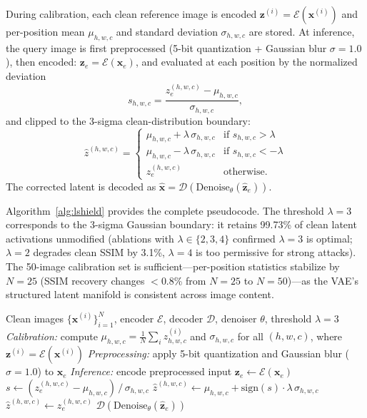 \documentclass[conference]{IEEEtran}
\begin{document}
\label{sec:algorithm}
During calibration, each clean reference image is encoded
$\mathbf{z}^{(i)}\!=\!\mathcal{E}(\mathbf{x}^{(i)})$ and per-position mean
$\mu_{h,w,c}$ and standard deviation $\sigma_{h,w,c}$ are stored. At inference,
the query image is first preprocessed (5-bit quantization + Gaussian blur
$\sigma\!=\!1.0$), then encoded: $\mathbf{z}_e\!=\!\mathcal{E}(\mathbf{x}_e)$,
and evaluated at
each position by the normalized deviation
\begin{equation}
  s_{h,w,c} = \frac{z_e^{(h,w,c)} - \mu_{h,w,c}}{\sigma_{h,w,c}},
\end{equation}
and clipped to the 3-sigma clean-distribution boundary:
\begin{equation}
  \hat{z}^{(h,w,c)} =
  \begin{cases}
    \mu_{h,w,c} + \lambda\,\sigma_{h,w,c} & \text{if } s_{h,w,c} > \lambda \\
    \mu_{h,w,c} - \lambda\,\sigma_{h,w,c} & \text{if } s_{h,w,c} < -\lambda \\
    z_e^{(h,w,c)} & \text{otherwise.}
  \end{cases}
\end{equation}
The corrected latent is decoded as
$\hat{\mathbf{x}}\!=\!\mathcal{D}(\mathrm{Denoise}_\theta(\hat{\mathbf{z}}_e))$.

Algorithm~\ref{alg:lshield} provides the complete pseudocode.
The threshold $\lambda\!=\!3$ corresponds to the 3-sigma Gaussian boundary:
it retains 99.73\% of clean latent activations unmodified (ablations with
$\lambda\!\in\!\{2,3,4\}$ confirmed $\lambda\!=\!3$ is optimal; $\lambda\!=\!2$
degrades clean SSIM by 3.1\%, $\lambda\!=\!4$ is too permissive for strong attacks).
The 50-image calibration set is sufficient---per-position statistics stabilize
by $N\!=\!25$ (SSIM recovery changes $<$0.8\% from $N\!=\!25$ to $N\!=\!50$)---as
the VAE's structured latent manifold is consistent across image content.

\begin{algorithm}[t]
\caption{L-SHIELD Defense}
\label{alg:lshield}
\begin{algorithmic}[1]
\REQUIRE Clean images $\{\mathbf{x}^{(i)}\}_{i=1}^{N}$, encoder $\mathcal{E}$,
  decoder $\mathcal{D}$, denoiser $\theta$, threshold $\lambda{=}3$
\STATE \textit{Calibration:} compute $\mu_{h,w,c}\!=\!\frac{1}{N}\sum_i z^{(i)}_{h,w,c}$
  and $\sigma_{h,w,c}$ for all $(h,w,c)$, where $\mathbf{z}^{(i)}\!=\!\mathcal{E}(\mathbf{x}^{(i)})$
\STATE \textit{Preprocessing:} apply 5-bit quantization and Gaussian blur
  ($\sigma{=}1.0$) to $\mathbf{x}_e$
\STATE \textit{Inference:} encode preprocessed input $\mathbf{z}_e \leftarrow \mathcal{E}(\mathbf{x}_e)$
  \STATE $s \leftarrow (z_e^{(h,w,c)} - \mu_{h,w,c})\,/\,\sigma_{h,w,c}$
    \STATE $\hat{z}^{(h,w,c)} \leftarrow
      \mu_{h,w,c} + \mathrm{sign}(s)\cdot\lambda\,\sigma_{h,w,c}$
  \ELSE
    \STATE $\hat{z}^{(h,w,c)} \leftarrow z_e^{(h,w,c)}$
  \ENDIF
\ENDFOR
\RETURN $\mathcal{D}\!\left(\mathrm{Denoise}_{\theta}(\hat{\mathbf{z}}_e)\right)$
\end{algorithmic}
\end{algorithm}
\end{document}
